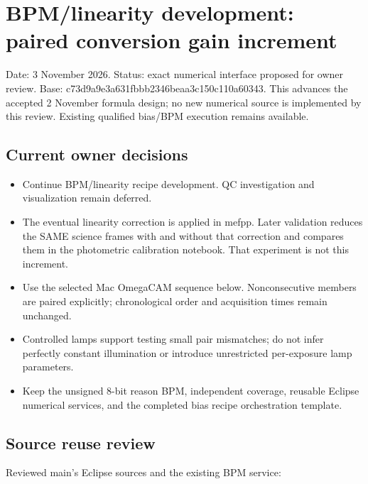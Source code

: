 \documentclass[
  10pt,
  a4paper,
]{article}
\author{}
\date{}
\providecommand{\tightlist}{%
  \setlength{\itemsep}{0pt}\setlength{\parskip}{0pt}}
\begin{document}
\hypertarget{bpmlinearity-development-paired-conversion-gain-increment}{%
\section{BPM/linearity development: paired conversion gain
increment}\label{bpmlinearity-development-paired-conversion-gain-increment}}

Date: 3 November 2026. Status: exact numerical interface proposed for
owner review. Base: c73d9a9e3a631fbbb2346beaa3c150c110a60343. This
advances the accepted 2 November formula design; no new numerical source
is implemented by this review. Existing qualified bias/BPM execution
remains available.

\hypertarget{current-owner-decisions}{%
\subsection{Current owner decisions}\label{current-owner-decisions}}

\begin{itemize}
\tightlist
\item
  Continue BPM/linearity recipe development. QC investigation and
  visualization remain deferred.
\item
  The eventual linearity correction is applied in mefpp. Later
  validation reduces the SAME science frames with and without that
  correction and compares them in the photometric calibration notebook.
  That experiment is not this increment.
\item
  Use the selected Mac OmegaCAM sequence below. Nonconsecutive members
  are paired explicitly; chronological order and acquisition times
  remain unchanged.
\item
  Controlled lamps support testing small pair mismatches; do not infer
  perfectly constant illumination or introduce unrestricted per-exposure
  lamp parameters.
\item
  Keep the unsigned 8-bit reason BPM, independent coverage, reusable
  Eclipse numerical services, and the completed bias recipe
  orchestration template.
\end{itemize}

\hypertarget{source-reuse-review}{%
\subsection{Source reuse review}\label{source-reuse-review}}

Reviewed main's Eclipse sources and the existing BPM service:
\end{document}
